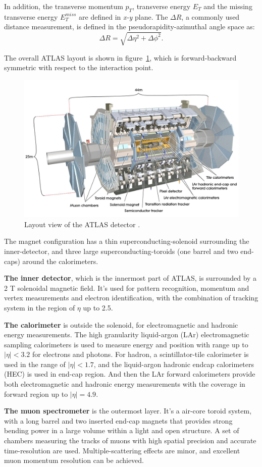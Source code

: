 In addition, the transverse momentum $p_{T}$, transverse energy $E_{T}$ and the missing transverse energy $E_{T}^{miss}$ are defined in \textit{x-y} plane.
The $\Delta R$, a commonly used distance measurement, is defined in the pseudorapidity-azimuthal angle space as:
\begin{equation}
    \Delta R = \sqrt{ \Delta\eta^{2} + \Delta\phi^{2}}.
\end{equation}

The overall ATLAS layout is shown in figure~\ref{fig:atlas_layout}, which is forward-backward symmetric with respect to the interaction point.
\begin{figure}[!htb]
  \centering
  \includegraphics[width=1.0\textwidth]{figures/Detector/atlas_layout.jpg}
  \caption{Layout view of the ATLAS detector \cite{Pequenao:1095924}.}
  \label{fig:atlas_layout}
\end{figure}
The magnet configuration has a thin superconducting-solenoid surrounding the inner-detector, 
and three large superconducting-toroids (one barrel and two end-caps) around the calorimeters.

\textbf{The inner detector}, which is the innermost part of ATLAS, is surrounded by a 2 T solenoidal magnetic field.
It's used for pattern recognition, momentum and vertex measurements and electron identification, with the combination of tracking system in the region of $\eta$ up to 2.5.

\textbf{The calorimeter} is outside the solenoid, for electromagnetic and hadronic energy measurements.
The high granularity liquid-argon (LAr) electromagnetic sampling calorimeters is used to measure energy and position with range up to $|\eta| < 3.2$ for electrons and photons.
For hadron, a scintillator-tile calorimeter is used in the range of $|\eta| < 1.7$, and the liquid-argon hadronic endcap calorimeters (HEC) is used in end-cap region.
And then the LAr forward calorimeters provide both electromagnetic and hadronic energy measurements with the coverage in forward region up to $|\eta| = 4.9$.

\textbf{The muon spectrometer} is the outermost layer.
It's a air-core toroid system, with a long barrel and two inserted end-cap magnets that provides strong bending power in a large volume within a light and open structure.
A set of chambers measuring the tracks of muons with high spatial precision and accurate time-resolution are used.
Multiple-scattering effects are minor, and excellent muon momentum resolution can be achieved.
